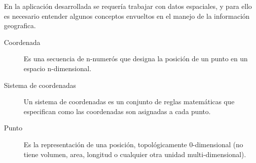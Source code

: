     En la aplicaci\'on desarrollada se requería trabajar con datos espaciales, y para ello es necesario entender algunos conceptos envueltos en el manejo de la informaci\'on geografica.

    \begin{description}
      \item[Coordenada] Es una secuencia de n-numer\'os que designa la posici\'on de un punto en un espacio n-dimensional. \\
      \item[Sistema de coordenadas] Un sistema de coordenadas es  un conjunto de reglas matemáticas que especifican como las coordenadas son asignadas  a cada  punto.
      \item[Punto] Es  la representaci\'on de una posici\'on, topol\'ogicamente 0-dimensional (no tiene volumen, area, longitud o cualquier otra unidad multi-dimensional).
    \end{description}





